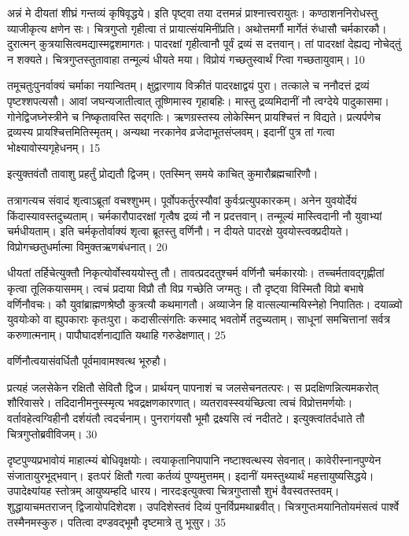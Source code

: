  
अन्नं मे दीयतां शीघ्रं गन्तव्यं कृषिवृद्धये।
 इति पृष्ट्वा तया दत्तमन्नं प्राश्नात्त्वरायुतः।
 कण्ठाशननिरोधस्तु व्याजीकृत्य क्षणेन सः।
 चित्रगुप्तो गृहीत्वा तं प्रायात्संयमिनींप्रति।
 अथोत्तमर्गौ मार्गेतं रुंधासौ चर्मकारकौ।
 दुरात्मन् कुत्रयासित्वमद्यास्मद्वशमागतः।
 पादरक्षां गृहीत्वानौ पूर्वं द्रव्यं स दत्तवान्।
 तां पादरक्षां देह्यद्य नोचेद्तुं न शक्यते।
 चित्रगुप्तस्तुतावाहा तन्मूल्यं धीयते मया।
 विप्रोयं गच्छतुस्वार्थं ग्त्विा गच्छतायुवाम्।
 10

  तमूचतुःपुनर्वाक्यं चर्माका नयान्वितम्।
 क्षुद्वारणाय विक्रीतं पादरक्षाद्वयं पुरा।
 तत्काले च ननौदत्तं द्रव्यं पृष्टश्शपत्यसौ।
 आवां जघन्यजातीत्वात् तूष्णिमास्व गृहाबहिः।
 मास्तु द्रव्यमिदानीं नौ त्वग्देये पादुकासमा।
 गोनेद्विजघ्नेस्त्रीने च निष्कृतावस्ति सद्गतिः।
 ऋणग्रस्तस्य लोकेस्मिन् प्रायश्चित्तं न विद्यते।
 प्रत्यर्पणेच द्रव्यस्य प्रायश्चित्तमितिस्मृतम्।
 अन्यथा नरकानेव व्रजेदाभूतसंप्लवम्।
 इदानीं पुत्र तां गत्वा भोक्ष्यावोस्यगृहेधनम्।
 15

  इत्युक्तवंतौ तावाशु प्रहर्तुं प्रोद्यतौ द्विजम्।
 एतस्मिन् समये काचित् कुमारौब्रह्मचारिणौ।
 
तत्रागत्यच संवादं शृत्वाऽब्रूतां वचश्शुभम्।
 पूर्वोपकर्तुरस्यौवां कुर्वःप्रत्युपकारकम्।
 अनेन युवयोर्देयं किंदास्यावस्तदुच्यताम्।
 चर्मकारौपादरक्षां गृत्वैष द्रव्यं नौ न प्रदत्तवान्।
 तन्मूल्यं मास्त्विदानी नौ युवाभ्यां चर्मधीयताम्।
 इति चर्मकृतोर्वाक्यं शृत्वा ब्रूतस्तु वर्णिनौ।
 न दीयते पादरक्षे युवयोस्त्वक्प्रदीयते।
 विप्रोगच्छतुधर्मात्मा विमुक्तऋणबंधनात्।
 20

  धीयतां तर्हिचेत्युक्तौ निकृत्योर्वोस्वययोस्तु तौ।
 तावत्प्रददतुश्चर्म वर्णिनौ चर्मकारयोः।
 तच्चर्मतावद्गृह्णीतां कृत्वा तूलिकयासमम्।
 त्वचं प्रदाया विप्रौ तौ विप्र गच्छेति जग्मतुः।
 तौ दृष्ट्वा विस्मितौ विप्रो बभाषे वर्णिनौवचः।
 कौ युवांब्राह्मणश्रेष्ठौ कुत्रत्यौ कथमागतौ।
 अव्याजेन हि वात्सल्यान्मयिस्नेहो निपातितः।
 दयाळ्वो युवयोःको वा ह्युपकाराः कृतःपुरा।
 कदासीत्संगतिः कस्माद् भवतोर्मे तदुच्यताम्।
 साधूनां समचित्तानां सर्वत्र करुणात्मनाम्।
 पापौघादर्शनाद्यांति यथाहि गरुडेक्षणात्।
 25

  वर्णिनौत्वयासंवर्धितौ पूर्वमावामश्वत्थ भूरुहौ।

प्रत्यहं जलसेकेन रक्षितौ सेवितौ द्विज।
 प्रार्थयन् पापनाशं च जलसेचनतत्परः।
 स प्रदक्षिणन्नित्यमकरोत् शौरिवासरे।
 तदिदानीमनुस्स्मृत्य भवद्रक्षणकारणात्।
 व्यतरावस्स्वयंच्छित्वा त्वचं विप्रोत्तमर्णयोः।
 वर्तावहेत्वग्विहीनौ दर्शयंतौ त्वदर्चनाम्।
 पुनरागंयसौ भूमौ द्रक्ष्यसि त्वं नदीतटे।
 इत्युक्त्वांतर्दधाते तौ चित्रगुप्तोब्रवीविजम्।
 30

  दृष्टपुण्यप्रभावोयं माहात्म्यं बोधिवृक्षयोः।
 त्वयाकृतानिपापानि नष्टाश्वत्थस्य सेवनात्।
 कावेरीस्नानपुण्येन संजातायुरभूद्भवान्।
 इतःपरं क्षितौ गत्वा कर्तव्यं पुण्यमुत्तमम्।
 इदानीं यमस्तुथ्यार्थं महत्तायुष्यसिद्धये।
 उपादेक्ष्यांयह स्तोत्रम् आयुष्यम्हदि धारय।
 नारदःइत्युक्त्वा चित्रगुप्तासौ शुभं वैवस्वतस्तवम्।
 शुद्धायाचमतराजन् द्विजायोपदिशेदश।
 उपदिशेस्तवं दिव्यं पुनर्विप्रमथाब्रवीत्।
 चित्रगुप्तःमयानितोयमंसत्वं पार्श्वे तस्मैनमस्कुरु।
 पतित्वा दण्डवद्भूमौ दृष्टमात्रे तु भूसुर।
 35

